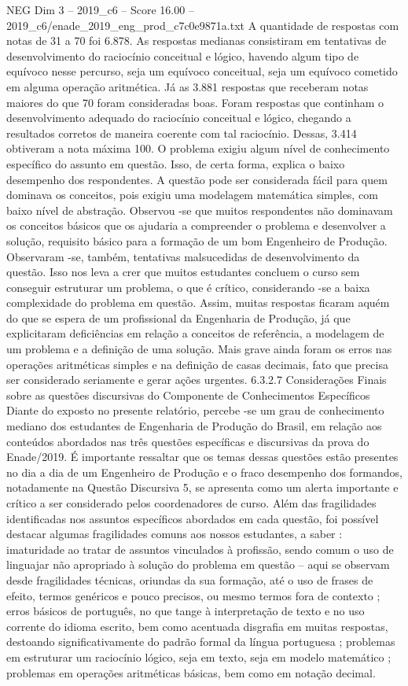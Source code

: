 \begin{textsample}{NEG Dim 3 – 2019\_c6 – Score 16.00 – 2019\_c6/enade\_2019\_eng\_prod\_c7c0e9871a.txt}
A quantidade de respostas com notas de 31 a 70 foi 6.878.
As respostas medianas consistiram em tentativas de desenvolvimento do raciocínio conceitual e lógico, havendo algum tipo de equívoco nesse percurso, seja um equívoco conceitual, seja um equívoco cometido em alguma operação aritmética.
Já as 3.881 respostas que receberam notas maiores do que 70 foram consideradas boas.
Foram respostas que continham o desenvolvimento adequado do raciocínio conceitual e lógico, chegando a resultados corretos de maneira coerente com tal raciocínio.
Dessas, 3.414 obtiveram a nota máxima 100.
O problema exigiu algum nível de conhecimento específico do assunto em questão.
Isso, de certa forma, explica o baixo desempenho dos respondentes.
A questão pode ser considerada fácil para quem dominava os conceitos, pois exigiu uma modelagem matemática simples, com baixo nível de abstração.
Observou -se que muitos respondentes não dominavam os conceitos básicos que os ajudaria a compreender o problema e desenvolver a solução, requisito básico para a formação de um bom Engenheiro de Produção.
Observaram -se, também, tentativas malsucedidas de desenvolvimento da questão.
Isso nos leva a crer que muitos estudantes concluem o curso sem conseguir estruturar um problema, o que é crítico, considerando -se a baixa complexidade do problema em questão.
Assim, muitas respostas ficaram aquém do que se espera de um profissional da Engenharia de Produção, já que explicitaram deficiências em relação a conceitos de referência, a modelagem de um problema e a definição de uma solução.
Mais grave ainda foram os erros nas operações aritméticas simples e na definição de casas decimais, fato que precisa ser considerado seriamente e gerar ações urgentes. 6.3.2.7 Considerações Finais sobre as questões discursivas do Componente de Conhecimentos Específicos Diante do exposto no presente relatório, percebe -se um grau de conhecimento mediano dos estudantes de Engenharia de Produção do Brasil, em relação aos conteúdos abordados nas três questões específicas e discursivas da prova do Enade/2019.
É importante ressaltar que os temas dessas questões estão presentes no dia a dia de um Engenheiro de Produção e o fraco desempenho dos formandos, notadamente na Questão Discursiva 5, se apresenta como um alerta importante e crítico a ser considerado pelos coordenadores de curso.
Além das fragilidades identificadas nos assuntos específicos abordados em cada questão, foi possível destacar algumas fragilidades comuns aos nossos estudantes, a saber : imaturidade ao tratar de assuntos vinculados à profissão, sendo comum o uso de linguajar não apropriado à solução do problema em questão – aqui se observam desde fragilidades técnicas, oriundas da sua formação, até o uso de frases de efeito, termos genéricos e pouco precisos, ou mesmo termos fora de contexto ; erros básicos de português, no que tange à interpretação de texto e no uso corrente do idioma escrito, bem como acentuada disgrafia em muitas respostas, destoando significativamente do padrão formal da língua portuguesa ; problemas em estruturar um raciocínio lógico, seja em texto, seja em modelo matemático ; problemas em operações aritméticas básicas, bem como em notação decimal.

\end{textsample}
